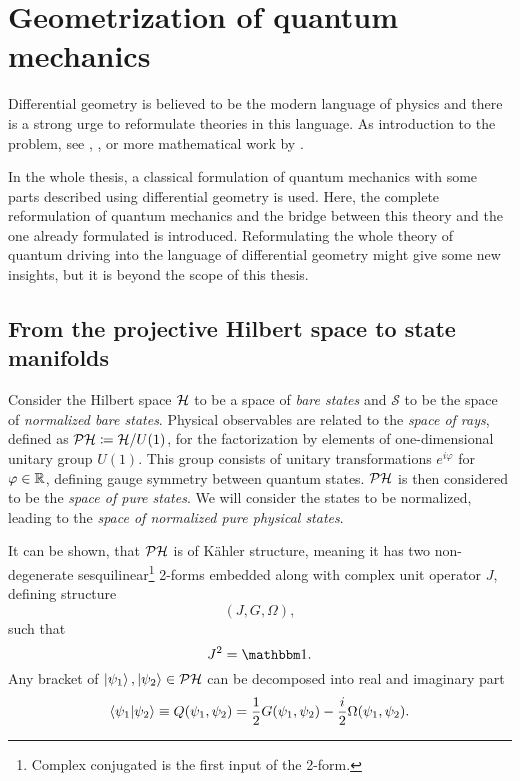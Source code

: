 \chapter{Geometrization of quantum mechanics}
\label{appendixGEOM}
Differential geometry is believed to be the modern language of physics and there is a strong urge to reformulate theories in this language. As introduction to the problem, see \cite{ashtekar_geometrical_1997}, \cite{ashtekar_geometry_1995}, or more mathematical work by \cite{molitor_exponential_2013}.

In the whole thesis, a classical formulation of quantum mechanics with some parts described using differential geometry is used. Here, the complete reformulation of quantum mechanics and the bridge between this theory and the one already formulated is introduced. Reformulating the whole theory of quantum driving into the language of differential geometry might give some new insights, but it is beyond the scope of this thesis.


\section{From the projective Hilbert space to state manifolds}


Consider the Hilbert space $\mathcal{H}$ to be a space of \emph{bare states} and $\mathcal{S}$ to be the space of \emph{normalized bare states}. Physical observables are related to the \emph{space of rays}, defined as $\mathcal{PH}\coloneqq \mathcal{H}/U(1)$, for the factorization by elements of one-dimensional unitary group $U(1)$. This group consists of unitary transformations $e^{i\varphi}$ for $\varphi\in\mathbb{R}$, defining gauge symmetry between quantum states. $\mathcal{PH}$ is then considered to be the \emph{space of pure states}. We will consider the states to be normalized, leading to the \emph{space of normalized pure physical states}. 

It can be shown, that $\mathcal{PH}$ is of K\"ahler structure, meaning it has two non-degenerate sesquilinear\footnote{Complex conjugated is the first input of the 2-form.} 2-forms embedded along with complex unit operator $J$, defining structure
$$(J, G, \Omega),$$
such that
\begin{equation}
    J^2=\Id.
\end{equation}
Any bracket of $\ket{\psi_1},\ket{\psi_2}\in \mathcal{PH}$ can be decomposed into real and imaginary part\citep{ashtekar_geometrical_1997}
\begin{equation}
    \braket{\psi_1|\psi_2}\equiv Q(\psi_1,\psi_2)=\frac{1}{2}G(\psi_1,\psi_2)-\frac{i}{2}\Omega(\psi_1,\psi_2).
\end{equation}

